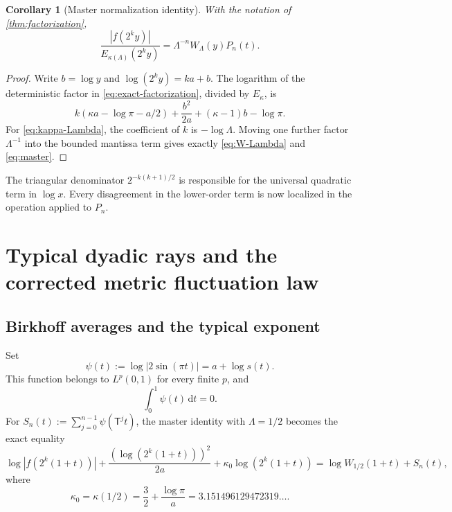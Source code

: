 \documentclass[11pt,oneside]{article}
\newtheorem{corollary}[theorem]{Corollary}
\theoremstyle{definition}
\theoremstyle{remark}
\newcommand{\dd}{\,\mathrm d}
\newcommand{\T}{\mathsf T}
\begin{document}
\begin{corollary}[Master normalization identity]
\label{cor:master}
With the notation of \cref{thm:factorization},
\begin{equation}
 \boxed{
 \frac{|f(2^ky)|}{E_{\kappa(\Lambda)}(2^ky)}
 =\Lambda^{-n}W_\Lambda(y)P_n(t).}
 \label{eq:master}
\end{equation}
\end{corollary}

\begin{proof}
Write $b=\log y$ and $\log(2^ky)=ka+b$.  The logarithm of the deterministic
factor in \eqref{eq:exact-factorization}, divided by $E_\kappa$, is
\[
 k(\kappa a-\log\pi-a/2)
 +\frac{b^2}{2a}+(\kappa-1)b-\log\pi.
\]
For \eqref{eq:kappa-Lambda}, the coefficient of $k$ is $-\log\Lambda$.
Moving one further factor $\Lambda^{-1}$ into the bounded mantissa term gives
exactly \eqref{eq:W-Lambda} and \eqref{eq:master}.
\end{proof}

The triangular denominator $2^{-k(k+1)/2}$ is responsible for the universal
quadratic term in $\log x$.  Every disagreement in the lower-order term is now
localized in the operation applied to $P_n$.

\section{Typical dyadic rays and the corrected metric fluctuation law}
\label{sec:metric}

\subsection{Birkhoff averages and the typical exponent}

Set
\begin{equation}
 \psi(t):=\log|2\sin(\pi t)|=a+\log s(t).
 \label{eq:psi}
\end{equation}
This function belongs to $L^p(0,1)$ for every finite $p$, and
\begin{equation}
 \int_0^1\psi(t)\dd t=0.
 \label{eq:psi-mean}
\end{equation}
For $S_n(t):=\sum_{j=0}^{n-1}\psi(\T^jt)$, the master identity with
$\Lambda=1/2$ becomes the exact equality
\begin{equation}
 \log|f(2^k(1+t))|
 +\frac{(\log(2^k(1+t)))^2}{2a}
 +\kappa_0\log(2^k(1+t))
 =\log W_{1/2}(1+t)+S_n(t),
 \label{eq:exact-centered}
\end{equation}
where
\begin{equation}
 \kappa_0=\kappa(1/2)
 =\frac32+\frac{\log\pi}{a}
 =3.151496129472319\ldots .
 \label{eq:kappa0}
\end{equation}
\end{document}
